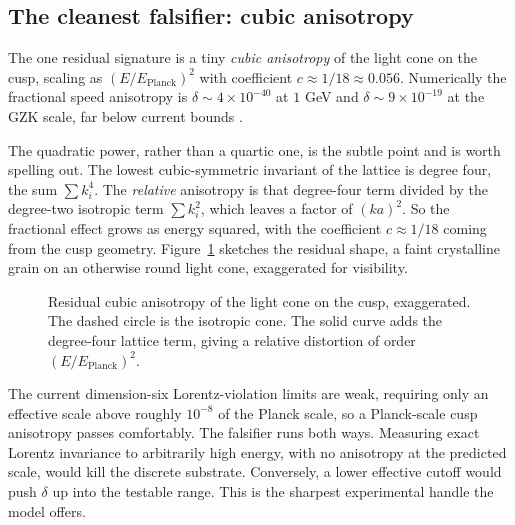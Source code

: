 \subsection{The cleanest falsifier: cubic anisotropy}

\begin{result}
The one residual signature is a tiny \emph{cubic anisotropy} of the light cone on the cusp, scaling as $(E/E_{\mathrm{Planck}})^2$ with coefficient $c \approx 1/18 \approx 0.056$. Numerically the fractional speed anisotropy is $\delta \sim 4\times 10^{-40}$ at $1$ GeV and $\delta \sim 9\times 10^{-19}$ at the GZK scale, far below current bounds \cite{pollard2026vibetest}.
\end{result}

The quadratic power, rather than a quartic one, is the subtle point and is worth spelling out. The lowest cubic-symmetric invariant of the lattice is degree four, the sum $\sum k_i^4$. The \emph{relative} anisotropy is that degree-four term divided by the degree-two isotropic term $\sum k_i^2$, which leaves a factor of $(ka)^2$. So the fractional effect grows as energy squared, with the coefficient $c \approx 1/18$ coming from the cusp geometry. Figure~\ref{fig:cubic-aniso} sketches the residual shape, a faint crystalline grain on an otherwise round light cone, exaggerated for visibility.

\begin{figure}[h]
\centering
{}
\caption{Residual cubic anisotropy of the light cone on the cusp, exaggerated. The dashed circle is the isotropic cone. The solid curve adds the degree-four lattice term, giving a relative distortion of order $(E/E_{\mathrm{Planck}})^2$.}
\label{fig:cubic-aniso}
\end{figure}

The current dimension-six Lorentz-violation limits are weak, requiring only an effective scale above roughly $10^{-8}$ of the Planck scale, so a Planck-scale cusp anisotropy passes comfortably. The falsifier runs both ways. Measuring exact Lorentz invariance to arbitrarily high energy, with no anisotropy at the predicted scale, would kill the discrete substrate. Conversely, a lower effective cutoff would push $\delta$ up into the testable range. This is the sharpest experimental handle the model offers.

